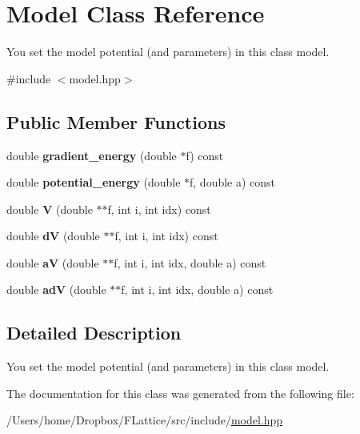 \hypertarget{class_model}{}\section{Model Class Reference}
\label{class_model}


You set the model potential (and parameters) in this class model.  




{\ttfamily \#include $<$model.\+hpp$>$}

\subsection*{Public Member Functions}
\begin{DoxyCompactItemize}
\item 
\mbox{\label{class_model_ab00000d80ed947859bc69f05322d8038}} 
double {\bfseries gradient\+\_\+energy} (double $\ast$f) const
\item 
\mbox{\label{class_model_ad84316146a32691f3c66f774eedcc139}} 
double {\bfseries potential\+\_\+energy} (double $\ast$f, double a) const
\item 
\mbox{\label{class_model_a4a75608c37107dfac5dc2f3e8b5b6665}} 
double {\bfseries V} (double $\ast$$\ast$f, int i, int idx) const
\item 
\mbox{\label{class_model_a21e3d33156c7ddc20a4bbf198ad43300}} 
double {\bfseries dV} (double $\ast$$\ast$f, int i, int idx) const
\item 
\mbox{\label{class_model_ac5eca5bd8d56ad529c767f89b020df8d}} 
double {\bfseries aV} (double $\ast$$\ast$f, int i, int idx, double a) const
\item 
\mbox{\label{class_model_a1d0c7d5e8de5e402a95a3290fc027bee}} 
double {\bfseries adV} (double $\ast$$\ast$f, int i, int idx, double a) const
\end{DoxyCompactItemize}


\subsection{Detailed Description}
You set the model potential (and parameters) in this class model. 

The documentation for this class was generated from the following file\+:\begin{DoxyCompactItemize}
\item 
/\+Users/home/\+Dropbox/\+F\+Lattice/src/include/\mbox{\hyperlink{model_8hpp}{model.\+hpp}}\end{DoxyCompactItemize}
